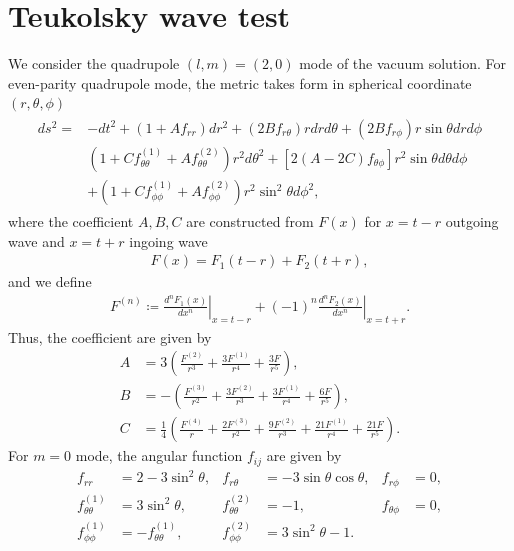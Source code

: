 \section{Teukolsky wave test}
\label{section4.2}
We consider the quadrupole $(l,m)=(2,0)$ mode of the vacuum solution.
For even-parity quadrupole mode, the metric takes form \cite{teukolsky1982linearized} in spherical coordinate $(r, \theta, \phi)$
\begin{align}
    \begin{split}
    ds^2 =& - dt^2 + \left(1 + A f_{rr}\right) dr^2 + \left(2 B f_{r\theta}\right) r dr d\theta
    + \left(2 B f_{r\phi} \right) r \sin\theta dr d\phi \\
    & \left(1 + C f^{(1)}_{\theta\theta} + A f^{(2)}_{\theta\theta} \right) r^2 d\theta^2
    + \left[2 \left(A-2C\right) f_{\theta\phi} \right] r^2 \sin\theta d\theta d\phi \\
    & + \left(1 + C f^{(1)}_{\phi\phi} + A f^{(2)}_{\phi\phi} \right) r^2 \sin^2\theta d\phi^2,
    \end{split}
\end{align}
where the coefficient $A,B,C$ are constructed from $F(x)$ for $x=t-r$ outgoing wave and $x=t+r$ ingoing wave
\begin{align}
    F(x) = F_1 (t-r) + F_2 (t+r),
\end{align}
and we define
\begin{align}
    F^{(n)} \coloneqq \left. \frac{d^n F_1(x)}{dx^n} \right|_{x=t-r} + (-1)^n \left. \frac{d^n F_2(x)}{dx^n} \right|_{x=t+r}.
\end{align}
Thus, the coefficient are given by
\begin{align}
    A &= 3 \left( \frac{F^{(2)}}{r^3} + \frac{3 F^{(1)}}{r^4} + \frac{3 F}{r^5} \right), \\
    B &= - \left( \frac{F^{(3)}}{r^2} + \frac{3F^{(2)}}{r^3} + \frac{3F^{(1)}}{r^4} + \frac{6F}{r^5} \right), \\
    C &= \frac{1}{4} \left( \frac{F^{(4)}}{r} + \frac{2F^{(3)}}{r^2} + \frac{9F^{(2)}}{r^3} + \frac{21F^{(1)}}{r^4} + \frac{21F}{r^5} \right).
\end{align}
For $m=0$ mode, the angular function $f_{ij}$ are given by
\begin{align}
    f_{rr} &= 2 - 3 \sin^2 \theta, & f_{r\theta} &= - 3 \sin\theta \cos\theta, & f_{r\phi} &= 0, \\
    f_{\theta\theta}^{(1)} &= 3 \sin^2\theta, & f_{\theta\theta}^{(2)} &= -1, & f_{\theta\phi} &= 0, \\
    f_{\phi\phi}^{(1)} &= - f_{\theta\theta}^{(1)}, & f_{\phi\phi}^{(2)} &= 3 \sin^2 \theta - 1.
\end{align}
